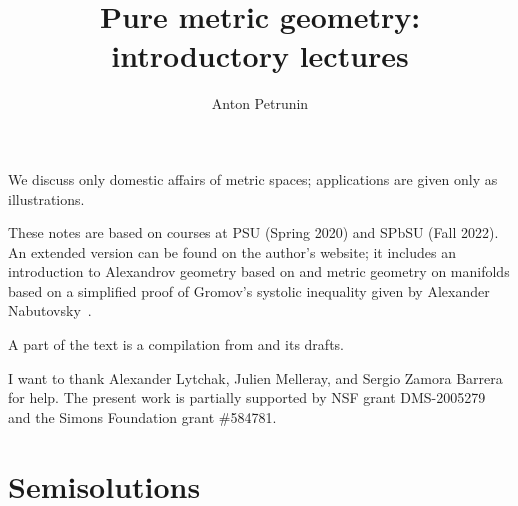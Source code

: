 \documentclass[twoside]{book}
\begin{document}

 
\title{Pure metric geometry:\\
introductory lectures}
\author{Anton Petrunin}
\date{}
\maketitle

We discuss only domestic affairs of metric spaces;
applications are given only as illustrations.

These notes are based on courses at PSU (Spring 2020) and SPbSU (Fall 2022).
An extended version can be found on the author's website;
it includes an introduction to Alexandrov geometry based on \cite{alexander-kapovitch-petrunin-2019} and metric geometry on manifolds \cite{petrunin2020mnfld} based on a simplified proof of Gromov's systolic inequality given by Alexander Nabutovsky~\cite{nabutovsky}.

A part of the text is a compilation from \cite{alexander-kapovitch-petrunin-2019, alexander-kapovitch-petrunin-2025, petrunin-yashinski, petrunin-2022-PIGTIKAL, petrunin-zamorabarrera} and its drafts.

I want to thank
Alexander Lytchak,
Julien Melleray,
and Sergio Zamora Barrera for help.
The present work is partially supported by NSF grant DMS-2005279
and the Simons Foundation grant \#584781.

\thispagestyle{empty}
\tableofcontents
\thispagestyle{empty}






%

\appendix
\chapter{Semisolutions}






{\small\sloppy


\def\emph{\textit}

\printbibliography[heading=bibintoc]
\fussy
}
\end{document}
